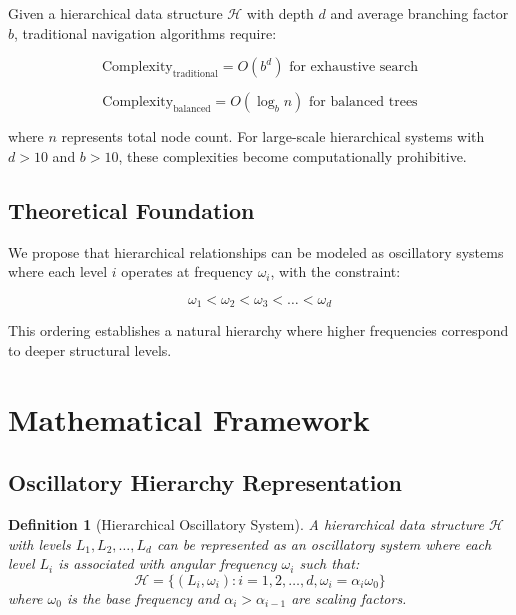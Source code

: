 \documentclass[12pt,a4paper]{article}
\newtheorem{definition}{Definition}
\begin{document}
Given a hierarchical data structure $\mathcal{H}$ with depth $d$ and average branching factor $b$, traditional navigation algorithms require:

\begin{equation}
\text{Complexity}_{\text{traditional}} = O(b^d) \text{ for exhaustive search}
\end{equation}

\begin{equation}
\text{Complexity}_{\text{balanced}} = O(\log_b n) \text{ for balanced trees}
\end{equation}

where $n$ represents total node count. For large-scale hierarchical systems with $d > 10$ and $b > 10$, these complexities become computationally prohibitive.

\subsection{Theoretical Foundation}

We propose that hierarchical relationships can be modeled as oscillatory systems where each level $i$ operates at frequency $\omega_i$, with the constraint:

\begin{equation}
\omega_1 < \omega_2 < \omega_3 < \ldots < \omega_d
\end{equation}

This ordering establishes a natural hierarchy where higher frequencies correspond to deeper structural levels.

\section{Mathematical Framework}

\subsection{Oscillatory Hierarchy Representation}

\begin{definition}[Hierarchical Oscillatory System]
A hierarchical data structure $\mathcal{H}$ with levels $L_1, L_2, \ldots, L_d$ can be represented as an oscillatory system where each level $L_i$ is associated with angular frequency $\omega_i$ such that:
\begin{equation}
\mathcal{H} = \{(L_i, \omega_i) : i = 1, 2, \ldots, d, \omega_i = \alpha_i \omega_0\}
\end{equation}
where $\omega_0$ is the base frequency and $\alpha_i > \alpha_{i-1}$ are scaling factors.
\end{definition}
\end{document}
